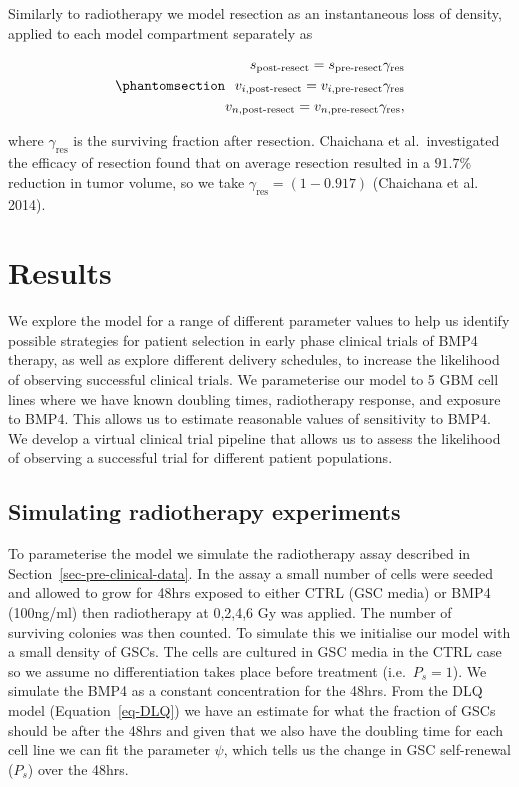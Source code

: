 \documentclass[
  default,
]{sn-jnl}
\begin{document}
Similarly to radiotherapy we model resection as an instantaneous loss of
density, applied to each model compartment separately as

\begin{equation}\phantomsection\label{eq-resection_model}{
  \begin{aligned}
    s_\text{post-resect} = s_\text{pre-resect} \gamma_\text{res} \\ 
    v_{i,\text{post-resect}} = v_{i,\text{pre-resect}} \gamma_\text{res} \\ 
    v_{n,\text{post-resect}} = v_{n,\text{pre-resect}} \gamma_\text{res},
  \end{aligned} 
}\end{equation}

where \(\gamma_{\text{res}}\) is the surviving fraction after resection.
Chaichana et al.~investigated the efficacy of resection found that on
average resection resulted in a \(91.7 \%\) reduction in tumor volume,
so we take \(\gamma_{\text{res}} = (1- 0.917)\) (Chaichana et al. 2014).

\section{Results}\label{sec-results}

We explore the model for a range of different parameter values to help
us identify possible strategies for patient selection in early phase
clinical trials of BMP4 therapy, as well as explore different delivery
schedules, to increase the likelihood of observing successful clinical
trials. We parameterise our model to 5 GBM cell lines where we have
known doubling times, radiotherapy response, and exposure to BMP4. This
allows us to estimate reasonable values of sensitivity to BMP4. We
develop a virtual clinical trial pipeline that allows us to assess the
likelihood of observing a successful trial for different patient
populations.

\subsection{Simulating radiotherapy
experiments}\label{sec-simulating-RT-experiments}

To parameterise the model we simulate the radiotherapy assay described
in Section~\ref{sec-pre-clinical-data}. In the assay a small number of
cells were seeded and allowed to grow for 48hrs exposed to either CTRL
(GSC media) or BMP4 (100ng/ml) then radiotherapy at 0,2,4,6 Gy was
applied. The number of surviving colonies was then counted. To simulate
this we initialise our model with a small density of GSCs. The cells are
cultured in GSC media in the CTRL case so we assume no differentiation
takes place before treatment (i.e.~\(P_s = 1\)). We simulate the BMP4 as
a constant concentration for the 48hrs. From the DLQ model
(Equation~\ref{eq-DLQ}) we have an estimate for what the fraction of
GSCs should be after the 48hrs and given that we also have the doubling
time for each cell line we can fit the parameter \(\psi\), which tells
us the change in GSC self-renewal (\(P_s\)) over the 48hrs.
\end{document}
